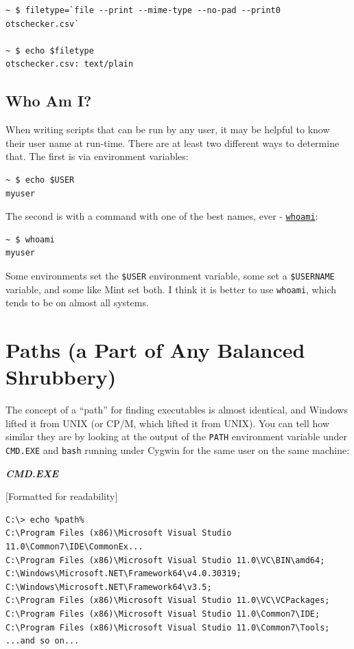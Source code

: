 \documentclass[10pt,]{book}
\numberwithin{figure}{chapter}
\begin{document}
\begin{verbatim}
~ $ filetype=`file --print --mime-type --no-pad --print0 otschecker.csv`

~ $ echo $filetype
otschecker.csv: text/plain
\end{verbatim}

\subsection{Who Am I?}\label{who-am-i}

When writing scripts that can be run by any user, it may be helpful to
know their user name at run-time. There are at least two different ways
to determine that. The first is via environment variables:

\begin{verbatim}
~ $ echo $USER
myuser
\end{verbatim}

The second is with a command with one of the best names, ever -
\href{http://linux.die.net/man/1/whoami}{\texttt{whoami}}:

\begin{verbatim}
~ $ whoami
myuser
\end{verbatim}

Some environments set the \texttt{\$USER} environment variable, some set
a \texttt{\$USERNAME} variable, and some like Mint set both. I think it
is better to use \texttt{whoami}, which tends to be on almost all
systems.

\section{Paths (a Part of Any Balanced
Shrubbery)}\label{paths-a-part-of-any-balanced-shrubbery}

The concept of a ``path'' for finding executables is almost identical,
and Windows lifted it from UNIX (or CP/M, which lifted it from UNIX).
You can tell how similar they are by looking at the output of the
\texttt{PATH} environment variable under \texttt{CMD.EXE} and
\texttt{bash} running under Cygwin for the same user on the same
machine:

\textbf{\emph{CMD.EXE}}

{[}Formatted for readability{]}

\begin{verbatim}
C:\> echo %path%
C:\Program Files (x86)\Microsoft Visual Studio 11.0\Common7\IDE\CommonEx...
C:\Program Files (x86)\Microsoft Visual Studio 11.0\VC\BIN\amd64;
C:\Windows\Microsoft.NET\Framework64\v4.0.30319;
C:\Windows\Microsoft.NET\Framework64\v3.5;
C:\Program Files (x86)\Microsoft Visual Studio 11.0\VC\VCPackages;
C:\Program Files (x86)\Microsoft Visual Studio 11.0\Common7\IDE;
C:\Program Files (x86)\Microsoft Visual Studio 11.0\Common7\Tools;
...and so on...
\end{verbatim}
\end{document}
